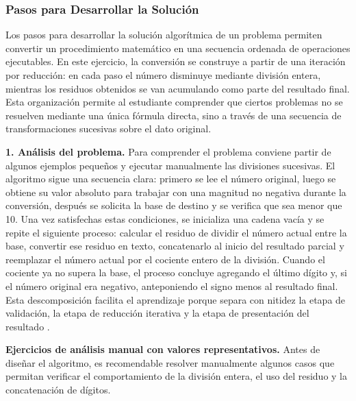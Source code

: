 \documentclass[12pt,twoside]{book}
\begin{document}
				\subsubsection{Pasos para Desarrollar la Solución}
					\noindent
					Los pasos para desarrollar la solución algorítmica de un problema permiten convertir un procedimiento matemático en una secuencia ordenada de operaciones ejecutables. En este ejercicio, la conversión se construye a partir de una iteración por reducción: en cada paso el número disminuye mediante división entera, mientras los residuos obtenidos se van acumulando como parte del resultado final. Esta organización permite al estudiante comprender que ciertos problemas no se resuelven mediante una única fórmula directa, sino a través de una secuencia de transformaciones sucesivas sobre el dato original.
					
					\noindent
					\textbf{1. Análisis del problema.}  
					Para comprender el problema conviene partir de algunos ejemplos pequeños y ejecutar manualmente las divisiones sucesivas. El algoritmo sigue una secuencia clara: primero se lee el número original, luego se obtiene su valor absoluto para trabajar con una magnitud no negativa durante la conversión, después se solicita la base de destino y se verifica que sea menor que 10. Una vez satisfechas estas condiciones, se inicializa una cadena vacía y se repite el siguiente proceso: calcular el residuo de dividir el número actual entre la base, convertir ese residuo en texto, concatenarlo al inicio del resultado parcial y reemplazar el número actual por el cociente entero de la división. Cuando el cociente ya no supera la base, el proceso concluye agregando el último dígito y, si el número original era negativo, anteponiendo el signo menos al resultado final. Esta descomposición facilita el aprendizaje porque separa con nitidez la etapa de validación, la etapa de reducción iterativa y la etapa de presentación del resultado \cite{Cormen2022Introduction,Sebesta2018Concepts,Qian2018Students}.
					
					\noindent
					\textbf{Ejercicios de análisis manual con valores representativos.}
					Antes de diseñar el algoritmo, es recomendable resolver manualmente algunos casos que permitan verificar el comportamiento de la división entera, el uso del residuo y la concatenación de dígitos.
					
\end{document}
